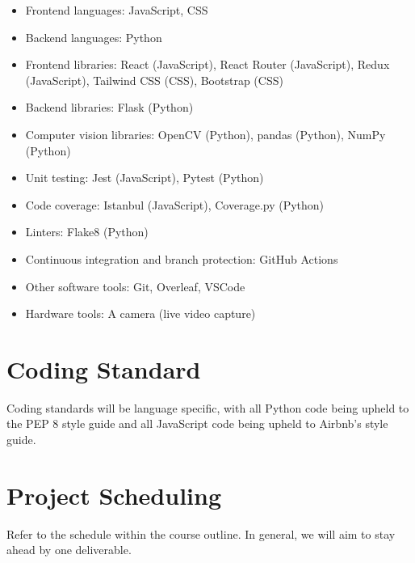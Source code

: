 \documentclass{article}
\begin{document}
\begin{itemize}
\item Frontend languages: JavaScript, CSS
\item Backend languages: Python
\item Frontend libraries: React (JavaScript), React Router (JavaScript), Redux (JavaScript), Tailwind CSS (CSS), Bootstrap (CSS)
\item Backend libraries: Flask (Python)
\item Computer vision libraries: OpenCV (Python), pandas (Python), NumPy (Python)
\item Unit testing: Jest (JavaScript), Pytest (Python)
\item Code coverage: Istanbul (JavaScript), Coverage.py (Python)
\item Linters: Flake8 (Python)
\item Continuous integration and branch protection: GitHub Actions
\item Other software tools: Git, Overleaf, VSCode
\item Hardware tools: A camera (live video capture)
\end{itemize}

\section{Coding Standard}

Coding standards will be language specific, with all Python code being upheld to the PEP 8 style guide and all JavaScript code being upheld to Airbnb's style guide.

\section{Project Scheduling}

Refer to the schedule within the course outline. In general, we will aim to stay ahead by one deliverable.

\end{document}
